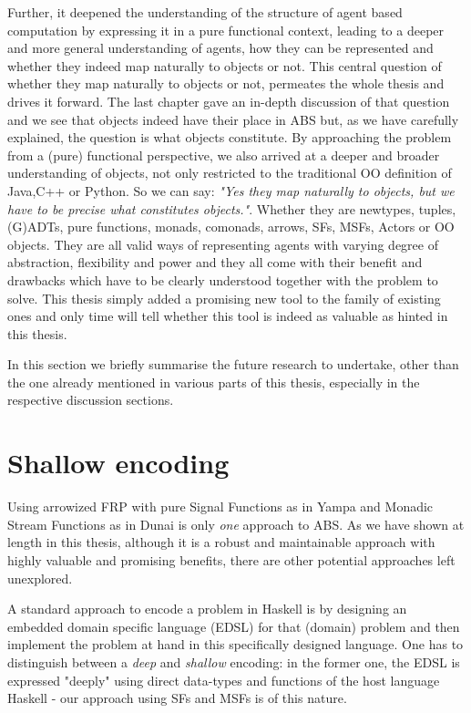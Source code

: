 Further, it deepened the understanding of the structure of agent based computation by expressing it in a pure functional context, leading to a deeper and more general understanding of agents, how they can be represented and whether they indeed map naturally to objects or not. This central question of whether they map naturally to objects or not, permeates the whole thesis and drives it forward. The last chapter gave an in-depth discussion of that question and we see that objects indeed have their place in ABS but, as we have carefully explained, the question is what objects constitute. By approaching the problem from a (pure) functional perspective, we also arrived at a deeper and broader understanding of objects, not only restricted to the traditional OO definition of Java,C++ or Python. So we can say: \textit{"Yes they map naturally to objects, but we have to be precise what constitutes objects."}. Whether they are newtypes, tuples, (G)ADTs, pure functions, monads, comonads, arrows, SFs, MSFs, Actors or OO objects. They are all valid ways of representing agents with varying degree of abstraction, flexibility and power and they all come with their benefit and drawbacks which have to be clearly understood together with the problem to solve. This thesis simply added a promising new tool to the family of existing ones and only time will tell whether this tool is indeed as valuable as hinted in this thesis.

In this section we briefly summarise the future research to undertake, other than the one already mentioned in various parts of this thesis, especially in the respective discussion sections.

\section{Shallow encoding}
Using arrowized FRP with pure Signal Functions as in Yampa and Monadic Stream Functions as in Dunai is only \textit{one} approach to ABS. As we have shown at length in this thesis, although it is a robust and maintainable approach with highly valuable and promising benefits, there are other potential approaches left unexplored.

A standard approach to encode a problem in Haskell is by designing an embedded domain specific language (EDSL) for that (domain) problem and then implement the problem at hand in this specifically designed language. One has to distinguish between a \textit{deep} and \textit{shallow} encoding: in the former one, the EDSL is expressed "deeply" using direct data-types and functions of the host language Haskell - our approach using SFs and MSFs is of this nature.


